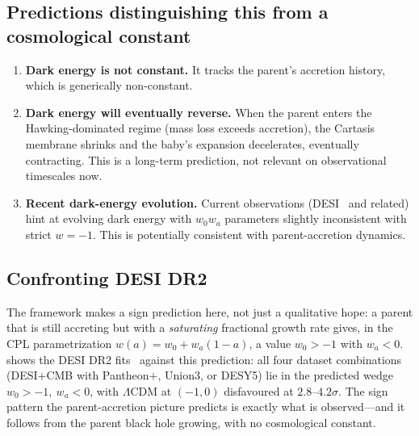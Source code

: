 \subsection{Predictions distinguishing this from a cosmological constant}

\begin{enumerate}
  \item \textbf{Dark energy is not constant.} It tracks the parent's accretion
    history, which is generically non-constant.
  \item \textbf{Dark energy will eventually reverse.} When the parent enters the
    Hawking-dominated regime (mass loss exceeds accretion), the Cartasis membrane
    shrinks and the baby's expansion decelerates, eventually contracting. This is
    a long-term prediction, not relevant on observational timescales now.
  \item \textbf{Recent dark-energy evolution.} Current observations
    (DESI~\citep{desi2024} and related) hint at evolving dark energy with
    $w_0 w_a$ parameters slightly inconsistent with strict $w = -1$. This is
    potentially consistent with parent-accretion dynamics.
\end{enumerate}

\subsection{Confronting DESI DR2}

The framework makes a sign prediction here, not just a qualitative hope: a parent
that is still accreting but with a \emph{saturating} fractional growth rate gives,
in the CPL parametrization $w(a)=w_0+w_a(1-a)$, a value $w_0>-1$ with $w_a<0$.
 shows the DESI DR2 fits~\citep{desi2025dr2} against this prediction:
all four dataset combinations (DESI$+$CMB with Pantheon$+$, Union3, or DESY5) lie
in the predicted wedge $w_0>-1,\ w_a<0$, with $\Lambda$CDM at $(-1,0)$ disfavoured
at $2.8$--$4.2\sigma$. The sign pattern the parent-accretion picture predicts is
exactly what is observed---and it follows from the parent black hole growing, with
no cosmological constant.

